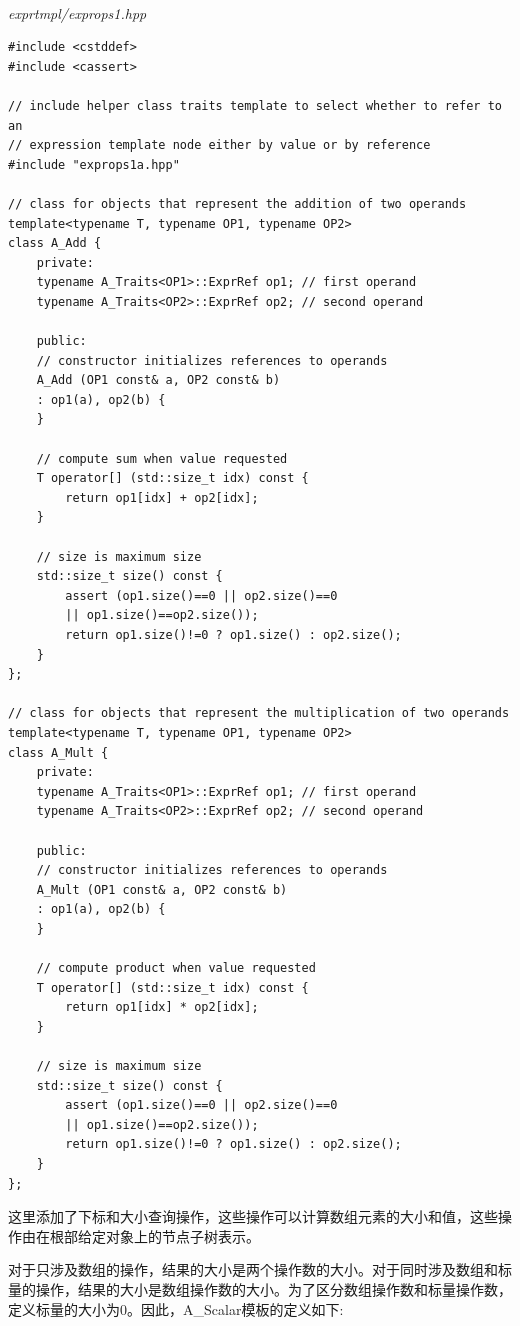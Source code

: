 \hspace*{\fill} \\ %
\noindent
\textit{exprtmpl/exprops1.hpp}
\begin{lstlisting}[style=styleCXX]
#include <cstddef>
#include <cassert>

// include helper class traits template to select whether to refer to an
// expression template node either by value or by reference
#include "exprops1a.hpp"

// class for objects that represent the addition of two operands
template<typename T, typename OP1, typename OP2>
class A_Add {
	private:
	typename A_Traits<OP1>::ExprRef op1; // first operand
	typename A_Traits<OP2>::ExprRef op2; // second operand
	
	public:
	// constructor initializes references to operands
	A_Add (OP1 const& a, OP2 const& b)
	: op1(a), op2(b) {
	}

	// compute sum when value requested
	T operator[] (std::size_t idx) const {
		return op1[idx] + op2[idx];
	}

	// size is maximum size
	std::size_t size() const {
		assert (op1.size()==0 || op2.size()==0
		|| op1.size()==op2.size());
		return op1.size()!=0 ? op1.size() : op2.size();
	}
};

// class for objects that represent the multiplication of two operands
template<typename T, typename OP1, typename OP2>
class A_Mult {
	private:
	typename A_Traits<OP1>::ExprRef op1; // first operand
	typename A_Traits<OP2>::ExprRef op2; // second operand
	
	public:
	// constructor initializes references to operands
	A_Mult (OP1 const& a, OP2 const& b)
	: op1(a), op2(b) {
	}

	// compute product when value requested
	T operator[] (std::size_t idx) const {
		return op1[idx] * op2[idx];
	}

	// size is maximum size
	std::size_t size() const {
		assert (op1.size()==0 || op2.size()==0
		|| op1.size()==op2.size());
		return op1.size()!=0 ? op1.size() : op2.size();
	}
};
\end{lstlisting}

这里添加了下标和大小查询操作，这些操作可以计算数组元素的大小和值，这些操作由在根部给定对象上的节点子树表示。

对于只涉及数组的操作，结果的大小是两个操作数的大小。对于同时涉及数组和标量的操作，结果的大小是数组操作数的大小。为了区分数组操作数和标量操作数，定义标量的大小为0。因此，A\_Scalar模板的定义如下:


